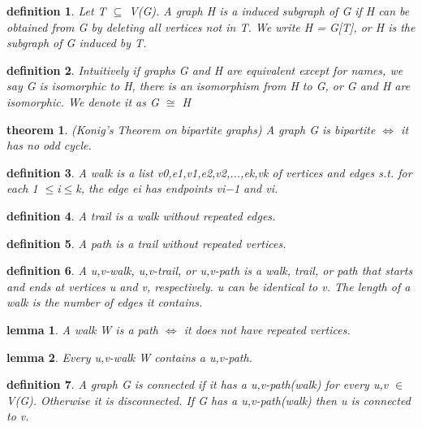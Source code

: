 \documentclass[twocolumn]{article}
\newtheorem{theorem}{theorem}[section]  %
\newtheorem{definition}{definition}
\newtheorem{lemma}{lemma}
\begin{document}
\begin{CJK*}{UTF8}{bkai}
    \begin{definition}
        Let T $\subseteq$ V(G). A graph H is a induced subgraph of G if H can be obtained
 from G by deleting all vertices not in T. We write H = G[T], or H is the
 subgraph of G induced by T.       
    \end{definition}

    \begin{definition}
         Intuitively if graphs G and H are equivalent except for names, we say G is
 isomorphic to H, there is an isomorphism from H to G, or G and H are
 isomorphic. We denote it as G $\cong$ H
    \end{definition}

    \begin{theorem}{(Konig's Theorem on bipartite graphs)}
        A graph G is bipartite $\iff$ it has no odd cycle.
    \end{theorem}

    \begin{definition}
        A walk is a list v0,e1,v1,e2,v2,...,ek,vk of vertices and edges s.t. for each
 1 $\leq$i$\leq$k, the edge ei has endpoints vi−1 and vi.
    \end{definition}

    \begin{definition}
        A trail is a walk without repeated edges.
    \end{definition}

    \begin{definition}
         A path is a trail without repeated vertices.
    \end{definition}

    \begin{definition}
         A u,v-walk, u,v-trail, or u,v-path is a walk, trail, or path that starts and ends
 at vertices u and v, respectively. u can be identical to v. The length of a walk
 is the number of edges it contains.
    \end{definition}

    \begin{lemma}
        A walk W is a path $\iff$ it does not have repeated vertices.
    \end{lemma}


    \begin{lemma}
        Every u,v-walk W contains a u,v-path.
    \end{lemma}

    \begin{definition}
         A graph G is connected if it has a u,v-path(walk) for every u,v $\in$ V(G).
 Otherwise it is disconnected. If G has a u,v-path(walk) then u is connected to
 v.
    \end{definition}


\end{CJK*}
\end{document}
